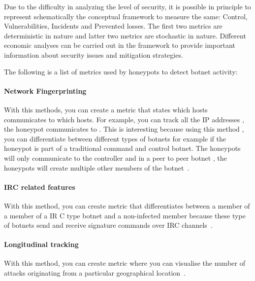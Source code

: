 


Due to the difficulty in analyzing the level of security, it is possible in principle to represent schematically the conceptual framework to measure the same: Control, Vulnerabilities, Incidents and Prevented losses. The first two metrics are deterministic in nature and latter two  metrics are stochastic in nature. Different economic analyses can be carried out in the framework to provide important information about security issues and mitigation strategies.

The following is a list of metrics used by honeypots to detect botnet activity:
\indent
\paragraph{Network Fingerprinting}
With this methods,  you can create a metric that states which hosts communicates to which hosts. For example, you can track all the IP addresses , the honeypot communicates to	. This is interesting because using this method , you can differentiate between different types of botnets for example if  the honeypot is part of a traditional command and control botnet. The honeypots will only communicate to the controller and  in a peer to peer botnet , the honeypots will create multiple other members of the botnet~\cite{GJ2007}.

\paragraph{IRC related features}
With this method, you can create metric that differentiates between a member of a member of a IR C type botnet and a non-infected member because these type of botnets  send and receive signature commands over IRC channels~\cite{AM2006}.

\paragraph{Longitudinal tracking}
With this method, you can create metric where you can visualise the number of attacks originating from a particular geographical location~\cite{AM2006}.

